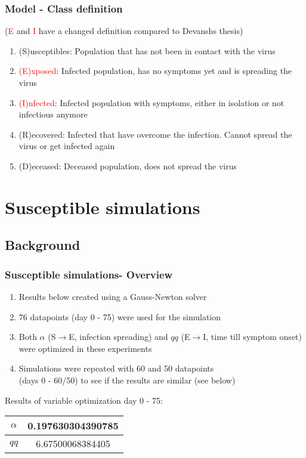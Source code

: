 \documentclass{beamer}
\begin{document}
\begin{frame}
	\frametitle{Model - Class definition}
	(\textcolor{red}{E} and \textcolor{red}{I} have a changed definition compared to Devanshs thesis)\newline
	\begin{enumerate}[$\bullet$]
		\item (S)usceptibles: Population that has not been in contact with the virus
		\item \textcolor{red}{(E)xposed}: Infected population, has no symptoms yet and is spreading the virus
		\item \textcolor{red}{(I)nfected}: Infected population with symptoms, either in isolation or not infectious anymore
		\item (R)ecovered: Infected that have overcome the infection. Cannot spread the virus or get infected again
		\item (D)eceased: Deceased population, does not spread the virus
	\end{enumerate}

\end{frame}

\section{Susceptible simulations}
\subsection{Background}
\begin{frame}
	\frametitle{Susceptible simulations- Overview}
	\begin{enumerate}[$\bullet$]
		\item Results below created using a Gauss-Newton solver
		\item 76 datapoints (day 0 - 75) were used for the simulation
		\item Both $\alpha$ (S$\rightarrow$E, infection spreading) and $qq$ (E$\rightarrow$I, time till symptom onset) were optimized in these experiments
		\item Simulations were repeated with 60 and 50 datapoints\\(days 0 - 60/50) to see if the results are similar (see below)
	\end{enumerate}
	\vspace{0.5cm}
	Results of variable optimization day 0 - 75:
	\begin{center}
	\begin{tabular}{|c|c|}
		\hline $\alpha$ & 0.197630304390785 \\
		\hline $qq$ & 6.67500068384405 \\ \hline
	\end{tabular}
	\end{center}
\end{frame}
\end{document}

